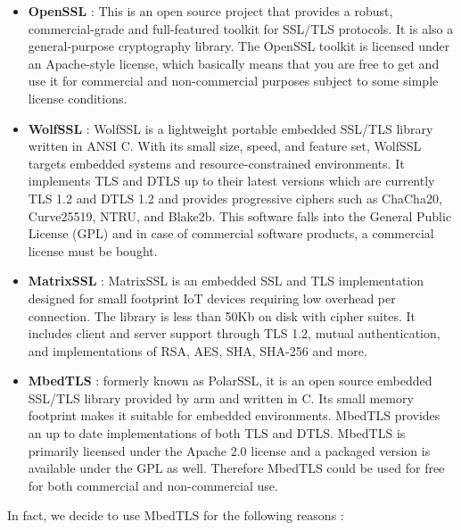 \renewcommand{\labelitemi}{$\bullet$}
\begin{itemize}
\item \textbf{OpenSSL} \cite{OpenSSL}: This is an open source project that provides a robust, commercial-grade and
full-featured toolkit for SSL/TLS protocols. It is also a general-purpose cryptography library.
The OpenSSL toolkit is licensed under an Apache-style license, which basically means that
you are free to get and use it for commercial and non-commercial purposes subject to some
simple license conditions.

\item \textbf{WolfSSL} \cite{WolfSSL}: WolfSSL is a lightweight portable embedded SSL/TLS library written in ANSI C.
With its small size, speed, and feature set, WolfSSL targets embedded systems and resource-constrained environments.
It implements TLS and DTLS up to their latest versions which are currently TLS 1.2 and DTLS 1.2 and provides
progressive ciphers such as ChaCha20, Curve25519, NTRU, and Blake2b. This
software falls into the General Public License (GPL) and in case of commercial software
products, a commercial license must be bought.

\item \textbf{MatrixSSL} \cite{MatrixSSL}: MatrixSSL is an embedded SSL and TLS implementation designed for
small footprint IoT devices requiring low overhead per connection. The library is less than 50Kb on disk
with cipher suites. It includes client and server support through TLS 1.2, mutual authentication,
 and implementations of RSA, AES, SHA, SHA-256 and more.

\item \textbf{MbedTLS} \cite{MbedTLS}: formerly known as PolarSSL, it is an open source embedded SSL/TLS library provided by arm and written in C.
Its small memory footprint makes it suitable for embedded environments. MbedTLS provides an up to date implementations of both TLS and DTLS.
MbedTLS is primarily licensed under the Apache 2.0 license and a packaged version is available under the GPL as well.
Therefore MbedTLS could be used for free for both commercial and non-commercial use.
\end{itemize}

In fact, we decide to use MbedTLS for the following reasons \cite{MbedTLS}:

